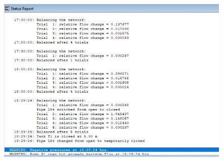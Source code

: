 \documentclass{beamer}
\begin{document}
\begin{frame}
\begin{columns}
\begin{column}{.5\textwidth}
\begin{figure}
\begin{overprint}
	   \begin{center}
	   \end{center}
%
		\begin{minipage}[c][.8\textheight][c]{\linewidth}
			\includegraphics[width=\linewidth]{images/v1_analysis}
		\end{minipage}
%
		\begin{minipage}[c][.8\textheight][c]{\linewidth}

\end{minipage}
\end{overprint}
\end{figure}
\end{column}
\end{columns}
\end{frame}
\end{document}
